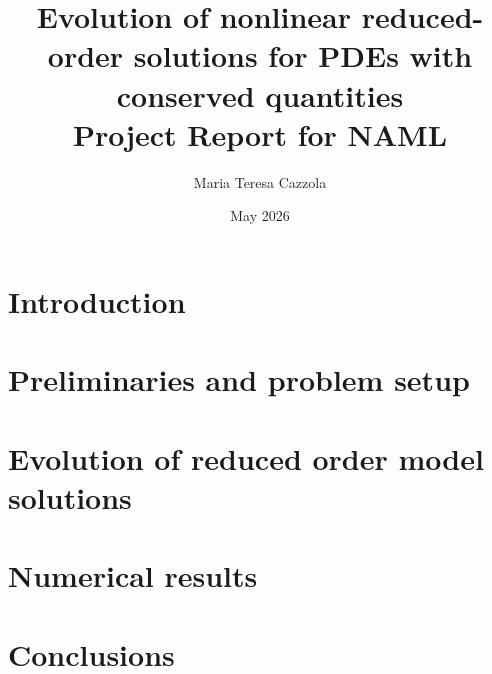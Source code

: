 \documentclass{article}
\title{Evolution of nonlinear reduced-order solutions for PDEs with conserved quantities
\\ \vspace{1em} \large Project Report for NAML}
\author{Maria Teresa Cazzola}
\date{May 2026}
\theoremstyle{definition}
\begin{document}

\maketitle

\begin{abstract}
    
\end{abstract}

\tableofcontents
\newpage

\label{section:intro}
\section{Introduction}


\label{section:setup}
\section{Preliminaries and problem setup}


\label{section:methodology}
\section{Evolution of reduced order model solutions}


\label{section:results}
\section{Numerical results} 
% 

\label{section:conclusions}
\section{Conclusions}
% 


\end{document}
